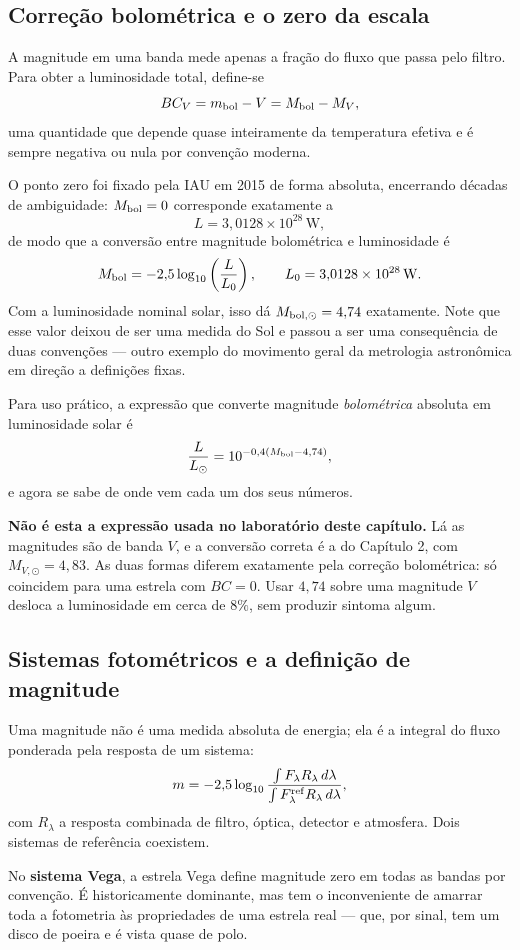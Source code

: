 \documentclass[11pt,a4paper]{article}
\begin{document}
\subsection*{Correção bolométrica e o zero da escala}

A magnitude em uma banda mede apenas a fração do fluxo que passa pelo filtro. Para obter a luminosidade total, define-se
\[
BC_V=m_{\rm bol}-V=M_{\rm bol}-M_V,
\]
uma quantidade que depende quase inteiramente da temperatura efetiva e é sempre negativa ou nula por convenção moderna.

O ponto zero foi fixado pela IAU em 2015 de forma absoluta, encerrando décadas de ambiguidade: $M_{\rm bol}=0$ corresponde exatamente a
\[
L=3{,}0128\times10^{28}\,\mathrm{W},
\]
de modo que a conversão entre magnitude bolométrica e luminosidade é
\[
M_{\rm bol}=-2{,}5\log_{10}\left(\frac{L}{L_0}\right),
\qquad
L_0=3{,}0128\times10^{28}\,\mathrm{W}.
\]
Com a luminosidade nominal solar, isso dá $M_{{\rm bol},\odot}=4{,}74$ exatamente. Note que esse valor deixou de ser uma medida do Sol e passou a ser uma consequência de duas convenções --- outro exemplo do movimento geral da metrologia astronômica em direção a definições fixas.

Para uso prático, a expressão que converte magnitude \emph{bolométrica} absoluta em luminosidade solar é
\[
\frac{L}{L_\odot}=10^{-0{,}4\left(M_{\rm bol}-4{,}74\right)},
\]
e agora se sabe de onde vem cada um dos seus números.

\textbf{Não é esta a expressão usada no laboratório deste capítulo.} Lá as magnitudes são de banda $V$, e a conversão correta é a do Capítulo 2, com $M_{V,\odot}=4{,}83$. As duas formas diferem exatamente pela correção bolométrica: só coincidem para uma estrela com $BC=0$. Usar $4{,}74$ sobre uma magnitude $V$ desloca a luminosidade em cerca de $8\%$, sem produzir sintoma algum.

\subsection*{Sistemas fotométricos e a definição de magnitude}

Uma magnitude não é uma medida absoluta de energia; ela é a integral do fluxo ponderada pela resposta de um sistema:
\[
m=-2{,}5\log_{10}\frac{\int F_\lambda R_\lambda\,d\lambda}{\int F_\lambda^{\rm ref}R_\lambda\,d\lambda},
\]
com $R_\lambda$ a resposta combinada de filtro, óptica, detector e atmosfera. Dois sistemas de referência coexistem.

No \textbf{sistema Vega}, a estrela Vega define magnitude zero em todas as bandas por convenção. É historicamente dominante, mas tem o inconveniente de amarrar toda a fotometria às propriedades de uma estrela real --- que, por sinal, tem um disco de poeira e é vista quase de polo.
\end{document}

